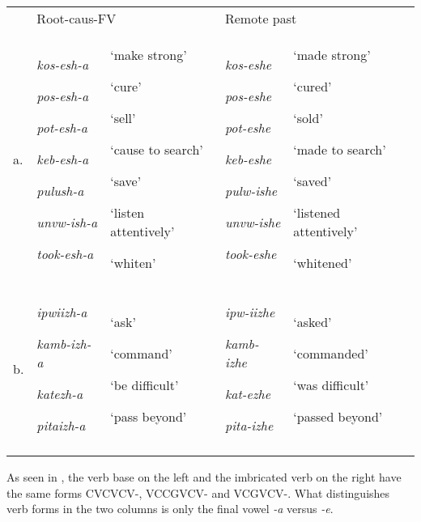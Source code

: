 \documentclass[output=paper]{langsci/langscibook}
\begin{document}
\begin{tabular}{lllll} & \multicolumn{2}{l}{\mdseries Root-caus-FV} & \multicolumn{2}{l}{\mdseries Remote past}\\
\lsptoprule
\mdseries a. & {\mdseries \emph{kos-esh-a}}

{\mdseries \emph{pos-esh-a}}

{\mdseries \emph{pot-esh-a}}

{\mdseries \emph{keb-esh-a}}

{\mdseries \emph{pulush-a}}

{\mdseries \emph{unvw-ish-a}}

\mdseries \emph{took-esh-a} & {\mdseries ‘make strong’}

{\mdseries ‘cure’}

{\mdseries ‘sell’}

{\mdseries ‘cause to search’}

{\mdseries ‘save’}

{\mdseries ‘listen attentively’}

\mdseries ‘whiten’ & {\mdseries \emph{kos-eshe}}

{\mdseries \emph{pos-eshe}}

{\mdseries \emph{pot-eshe}}

{\mdseries \emph{keb-eshe}}

{\mdseries \emph{pulw-ishe}}

{\mdseries \emph{unvw-ishe}}

\mdseries \emph{took-eshe} & {\mdseries ‘made strong’}

{\mdseries ‘cured’}

{\mdseries ‘sold’}

{\mdseries ‘made to search’}

{\mdseries ‘saved’}

{\mdseries ‘listened attentively’}

\mdseries ‘whitened’\\
\mdseries b. & {\mdseries \emph{ipwiizh-a}}

{\mdseries \emph{kamb-izh-a}}

{\mdseries \emph{katezh-a}}

\mdseries \emph{pitaizh-a} & {\mdseries ‘ask’}

{\mdseries ‘command’}

{\mdseries ‘be difficult’}

\mdseries ‘pass beyond’ & {\mdseries \emph{ipw-iizhe}}

{\mdseries \emph{kamb-izhe}}

{\mdseries \emph{kat-ezhe}}

\mdseries \emph{pita-izhe} & {\mdseries ‘asked’}

{\mdseries ‘commanded’}

{\mdseries ‘was difficult’}

\mdseries ‘passed beyond’\\
\lspbottomrule
\end{tabular}
As seen in , the verb base on the left and the imbricated verb on the right have the same forms CVCVCV-, VCCGVCV- and VCGVCV-. What distinguishes verb forms in the two columns is only the final vowel \emph{{}-a} versus \emph{{}-e}.
\end{document}
